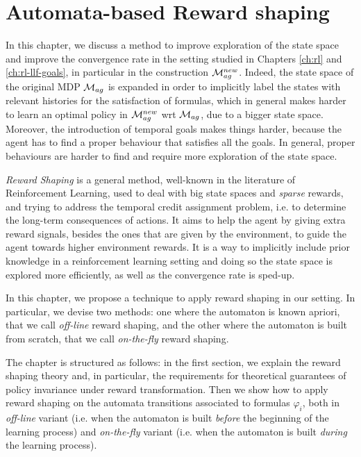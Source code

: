\chapter{Automata-based Reward shaping}\label{ch:reward-shaping}
In this chapter, we discuss a method to improve exploration of the state space and improve the convergence rate in the setting studied in Chapters \ref{ch:rl} and \ref{ch:rl-llf-goals}, in particular in the construction $\mathcal{M}_{ag}^{new}$. 
Indeed, the state space of the original MDP $\mathcal{M}_{ag}$ is expanded in order to implicitly label the states with relevant histories for the satisfaction of \LLf formulas, which in general makes harder to learn an optimal policy in $\mathcal{M}_{ag}^{new}$ wrt $\mathcal{M}_{ag}$, due to a bigger state space. 
Moreover, the introduction of temporal goals makes things harder, because the agent has to find a proper behaviour that satisfies all the goals. In general, proper behaviours are harder to find and require more exploration of the state space.

\emph{Reward Shaping} is a general method, well-known in the literature of Reinforcement Learning, used to deal with big state spaces and \emph{sparse} rewards, and trying to address the temporal
credit assignment problem, i.e. to determine
the long-term consequences of actions. It aims to help the agent by giving extra reward signals, besides the ones that are given by the environment, to guide the agent towards higher environment rewards. It is a way to implicitly include prior knowledge in a reinforcement learning setting and doing so the state space is explored more efficiently, as well as the convergence rate is sped-up.

In this chapter, we propose a technique to apply reward shaping in our setting. In particular, we devise two methods: one where the automaton is known apriori, that we call \emph{off-line} reward shaping, and the other where the automaton is built from scratch, that we call \emph{on-the-fly} reward shaping.

The chapter is structured as follows: in the first section, we explain the reward shaping theory and, in particular, the requirements for theoretical guarantees of policy invariance under reward transformation. Then we show how to apply reward shaping on the automata transitions associated to \LLf formulas $\varphi_i$, both in \emph{off-line} variant (i.e. when the automaton is built \emph{before} the beginning of the learning process)  and \emph{on-the-fly} variant (i.e. when the automaton is built \emph{during} the learning process).
 
